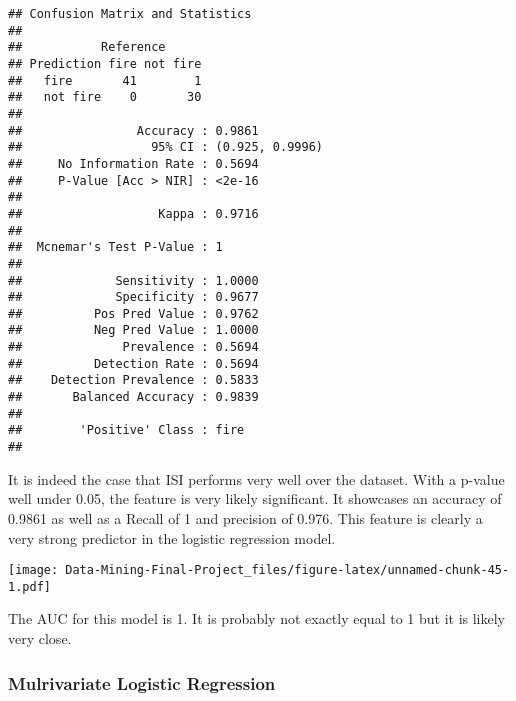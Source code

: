 \documentclass[
]{article}
\newenvironment{Shaded}{\begin{snugshade}}{\end{snugshade}}
\newcommand{\AttributeTok}[1]{\textcolor[rgb]{0.13,0.29,0.53}{#1}}
\newcommand{\ConstantTok}[1]{\textcolor[rgb]{0.56,0.35,0.01}{#1}}
\newcommand{\FunctionTok}[1]{\textcolor[rgb]{0.13,0.29,0.53}{\textbf{#1}}}
\newcommand{\NormalTok}[1]{#1}
\newcommand{\OtherTok}[1]{\textcolor[rgb]{0.56,0.35,0.01}{#1}}
\newcommand{\SpecialCharTok}[1]{\textcolor[rgb]{0.81,0.36,0.00}{\textbf{#1}}}
\newcommand{\StringTok}[1]{\textcolor[rgb]{0.31,0.60,0.02}{#1}}
\begin{document}
\begin{verbatim}
## Confusion Matrix and Statistics
## 
##           Reference
## Prediction fire not fire
##   fire       41        1
##   not fire    0       30
##                                          
##                Accuracy : 0.9861         
##                  95% CI : (0.925, 0.9996)
##     No Information Rate : 0.5694         
##     P-Value [Acc > NIR] : <2e-16         
##                                          
##                   Kappa : 0.9716         
##                                          
##  Mcnemar's Test P-Value : 1              
##                                          
##             Sensitivity : 1.0000         
##             Specificity : 0.9677         
##          Pos Pred Value : 0.9762         
##          Neg Pred Value : 1.0000         
##              Prevalence : 0.5694         
##          Detection Rate : 0.5694         
##    Detection Prevalence : 0.5833         
##       Balanced Accuracy : 0.9839         
##                                          
##        'Positive' Class : fire           
## 
\end{verbatim}

It is indeed the case that ISI performs very well over the dataset. With
a p-value well under 0.05, the feature is very likely significant. It
showcases an accuracy of 0.9861 as well as a Recall of 1 and precision
of 0.976. This feature is clearly a very strong predictor in the
logistic regression model.

\begin{Shaded}
\end{Shaded}

\texttt{[image: Data-Mining-Final-Project\_files/figure-latex/unnamed-chunk-45-1.pdf]}

The AUC for this model is 1. It is probably not exactly equal to 1 but
it is likely very close.

\subsubsection{Mulrivariate Logistic
Regression}\label{mulrivariate-logistic-regression}
\end{document}
